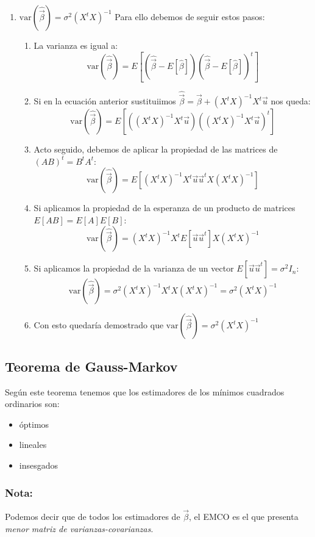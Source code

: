 \documentclass[a4paper,12pt]{article}
\newcommand{\ecuacion}[1]{\ensuremath{#1}}
\begin{document}
\begin{enumerate}
    \item \(\text{var}(\hat{\vec{\beta}}) = \sigma^2(X^tX)^{-1}\)
    Para ello debemos de seguir estos pasos:   
    \begin{enumerate}
        \item La varianza es igual a:
        \[
            \text{var}(\hat{\vec{\beta}}) = E[(\hat{\vec{\beta}}-E[\hat{\beta}]) (\hat{\vec{\beta}}-E[\hat{\beta}])^{t}]
        \]
        \item Si en la ecuación anterior sustituiimos \ecuacion{\hat{\vec{\beta}} = \vec{\beta} + (X^tX)^{-1}X^t\vec{u}} nos queda:
        \[
            \text{var}(\hat{\vec{\beta}}) = E[((X^tX)^{-1}X^t\vec{u})((X^tX)^{-1}X^t\vec{u})^{t}]
        \]
        \item Acto seguido, debemos de aplicar la propiedad de las matrices de \ecuacion{(AB)^t = B^tA^t}:
        \[
            \text{var}(\hat{\vec{\beta}}) = E[(X^tX)^{-1}X^t\vec{u}\vec{u}^tX(X^tX)^{-1}]
        \]
        \item Si aplicamos la propiedad de la esperanza de un producto de matrices \ecuacion{E[AB] = E[A]E[B]}:
        \[
            \text{var}(\hat{\vec{\beta}}) = (X^tX)^{-1}X^tE[\vec{u}\vec{u}^t]X(X^tX)^{-1}
        \]
        \item Si aplicamos la propiedad de la varianza de un vector \ecuacion{E[\vec{u}\vec{u}^t] = \sigma^2I_n}:
        \[
            \text{var}(\hat{\vec{\beta}}) = \sigma^2(X^tX)^{-1}X^tX(X^tX)^{-1} = \sigma^2(X^tX)^{-1}
        \]
        \item Con esto quedaría demostrado que \ecuacion{\text{var}(\hat{\vec{\beta}}) = \sigma^2(X^tX)^{-1}}
    \end{enumerate}
\end{enumerate}


\subsection{Teorema de Gauss-Markov}

Según este teorema tenemos que los estimadores de los mínimos cuadrados ordinarios son:
\begin{itemize}
    \item óptimos
    \item lineales
    \item insesgados    
\end{itemize}

\subsubsection*{Nota:}
Podemos decir que de todos los estimadores de \ecuacion{\vec{\beta}}, el EMCO es el que presenta \textit{ menor matriz de varianzas-covarianzas}.
\end{document}
